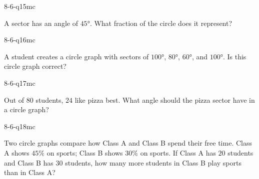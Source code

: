 \begin{practiceQuestion}{8-6-q15}{mc}
\begin{questionText}
A sector has an angle of $45°$. What fraction of the circle does it represent?
\end{questionText}
\end{practiceQuestion}

\begin{practiceQuestion}{8-6-q16}{mc}
\begin{questionText}
A student creates a circle graph with sectors of $100°$, $80°$, $60°$, and $100°$. Is this circle graph correct?
\end{questionText}
\end{practiceQuestion}

\begin{practiceQuestion}{8-6-q17}{mc}
\begin{questionText}
Out of $80$ students, $24$ like pizza best. What angle should the pizza sector have in a circle graph?
\end{questionText}
\end{practiceQuestion}

\begin{practiceQuestion}{8-6-q18}{mc}
\begin{questionText}
Two circle graphs compare how Class A and Class B spend their free time. Class A shows $45\%$ on sports; Class B shows $30\%$ on sports. If Class A has $20$ students and Class B has $30$ students, how many more students in Class B play sports than in Class A?
\end{questionText}
\end{practiceQuestion}


